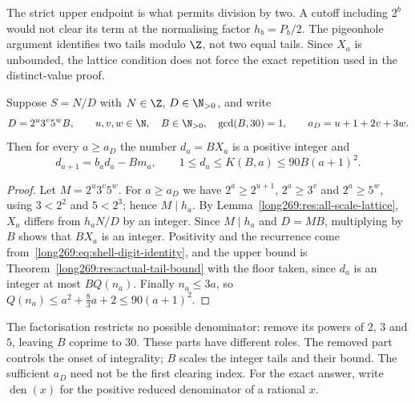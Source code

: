 The strict upper endpoint is what permits division by two.  A cutoff
including $2^b$ would not clear its term at the normalising factor $h_b=P_b/2$.
The pigeonhole argument identifies two tails modulo $\Z$, not two equal
tails. Since $X_a$ is unbounded, the lattice condition does not force
the exact repetition used in the distinct-value proof.

\begin{theorem}
\label{long269:res:actual-cancellation}\label{long269:res:lead-carry-bridge}
\label{long269:res:actual-carry-bound}\label{long269:res:denominator-reduction}
Suppose $S=N/D$ with $N\in\Z$, $D\in\N_{>0}$, and write
\[
 D=2^{u}3^{v}5^{w}B,\qquad u,v,w\in\N,\quad B\in\N_{>0},\quad\gcd(B,30)=1,
 \qquad a_D=u+1+2v+3w .
\]
Then for every $a\ge a_D$ the number $d_a=BX_a$ is a positive integer and
\[
 d_{a+1}=b_ad_a-Bm_a,\qquad 1\le d_a\le K(B,a)\le90B(a+1)^{2} .
\]
\end{theorem}

\begin{proof}
Let $M=2^{u}3^{v}5^{w}$.  For $a\ge a_D$ we have $2^{a}\ge2^{u+1}$,
$2^{a}\ge3^{v}$ and $2^{a}\ge5^{w}$, using $3<2^{2}$ and $5<2^{3}$; hence
$M\mid h_a$.  By Lemma~\ref{long269:res:all-scale-lattice}, $X_a$ differs from $h_aN/D$
by an integer.  Since $M\mid h_a$ and $D=MB$, multiplying by $B$ shows
that $BX_a$ is an integer.  Positivity and the
recurrence come from~\eqref{long269:eq:shell-digit-identity}, and the upper bound is
Theorem~\ref{long269:res:actual-tail-bound} with the floor taken, since $d_a$ is an
integer at most $BQ(n_a)$.  Finally $n_a\le3a$, so
$Q(n_a)\le a^{2}+\tfrac83a+2\le90(a+1)^{2}$.
\end{proof}

The factorisation restricts no possible denominator: remove its powers
of $2$, $3$ and $5$, leaving $B$ coprime to $30$. These parts have
different roles. The removed part controls the onset of integrality;
$B$ scales the integer tails and their bound. The sufficient $a_D$ need
not be the first clearing index. For the exact answer, write
$\operatorname{den}(x)$ for the positive reduced denominator of a rational $x$.

